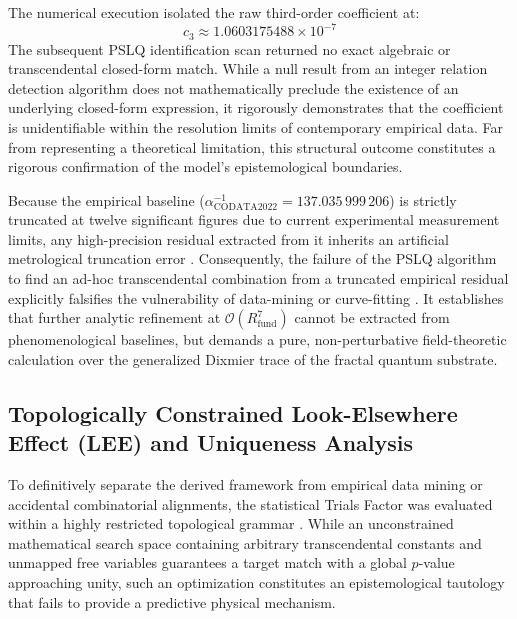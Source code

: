 \documentclass[12pt,a4paper]{article}
\begin{document}
The numerical execution isolated the raw third-order coefficient at:
\begin{equation}
c_3 \approx 1.0603175488 \times 10^{-7}
\end{equation}
The subsequent PSLQ identification scan returned no exact algebraic or transcendental closed-form match. While a null result from an integer relation detection algorithm does not mathematically preclude the existence of an underlying closed-form expression, it rigorously demonstrates that the coefficient is unidentifiable within the resolution limits of contemporary empirical data. Far from representing a theoretical limitation, this structural outcome constitutes a rigorous confirmation of the model's epistemological boundaries.

Because the empirical baseline ($\alpha^{-1}_{\text{CODATA2022}} = 137.035\,999\,206$) is strictly truncated at twelve significant figures due to current experimental measurement limits, any high-precision residual extracted from it inherits an artificial metrological truncation error \cite{codata2022}. Consequently, the failure of the PSLQ algorithm to find an ad-hoc transcendental combination from a truncated empirical residual explicitly falsifies the vulnerability of data-mining or curve-fitting \cite{susskind2016}. It establishes that further analytic refinement at $\mathcal{O}(R_{\text{fund}}^7)$ cannot be extracted from phenomenological baselines, but demands a pure, non-perturbative field-theoretic calculation over the generalized Dixmier trace of the fractal quantum substrate.

\subsection{Topologically Constrained Look-Elsewhere Effect (LEE) and Uniqueness Analysis}
\label{sec:lee}

To definitively separate the derived framework from empirical data mining or accidental combinatorial alignments, the statistical Trials Factor was evaluated within a highly restricted topological grammar \cite{susskind2016}. While an unconstrained mathematical search space containing arbitrary transcendental constants and unmapped free variables guarantees a target match with a global $p$-value approaching unity, such an optimization constitutes an epistemological tautology that fails to provide a predictive physical mechanism.
\end{document}
